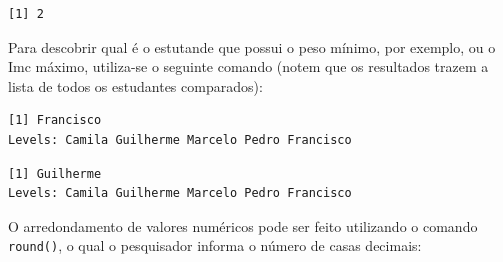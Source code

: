 \documentclass[12pt,brazil,oneside]{book}
\newenvironment{Shaded}{\begin{snugshade}}{\end{snugshade}}
\newcommand{\CommentTok}[1]{\textcolor[rgb]{0.56,0.35,0.01}{\textit{#1}}}
\newcommand{\DecValTok}[1]{\textcolor[rgb]{0.00,0.00,0.81}{#1}}
\newcommand{\KeywordTok}[1]{\textcolor[rgb]{0.13,0.29,0.53}{\textbf{#1}}}
\newcommand{\NormalTok}[1]{#1}
\newcommand{\OperatorTok}[1]{\textcolor[rgb]{0.81,0.36,0.00}{\textbf{#1}}}
\begin{document}
\begin{Shaded}
\end{Shaded}

\begin{verbatim}
[1] 2
\end{verbatim}

Para descobrir qual é o estutande que possui o peso mínimo, por exemplo, ou o Imc máximo, utiliza-se o seguinte comando (notem que os resultados trazem a lista de todos os estudantes comparados):

\begin{Shaded}
\end{Shaded}

\begin{verbatim}
[1] Francisco
Levels: Camila Guilherme Marcelo Pedro Francisco
\end{verbatim}

\begin{Shaded}
\end{Shaded}

\begin{verbatim}
[1] Guilherme
Levels: Camila Guilherme Marcelo Pedro Francisco
\end{verbatim}

O arredondamento de valores numéricos pode ser feito utilizando o comando \texttt{round()}, o qual o pesquisador informa o número de casas decimais:

\begin{Shaded}
\end{Shaded}
\end{document}
